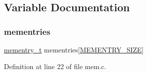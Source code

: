 \subsection{Variable Documentation}
\mbox{\label{a00107_a9ec3d7a60bca9bd965aba15905c6d1ed_a9ec3d7a60bca9bd965aba15905c6d1ed}} 
\subsubsection{\texorpdfstring{mementries}{mementries}}
{\footnotesize\ttfamily \hyperlink{a00110_a876b6ee19692762a87e4673911f9b8da_a876b6ee19692762a87e4673911f9b8da}{mementry\+\_\+t} mementries\mbox{[}\hyperlink{a00107_a48623ea6ed429e2f046b49041dde1dc5_a48623ea6ed429e2f046b49041dde1dc5}{M\+E\+M\+E\+N\+T\+R\+Y\+\_\+\+S\+I\+ZE}\mbox{]}}



Definition at line 22 of file mem.\+c.

